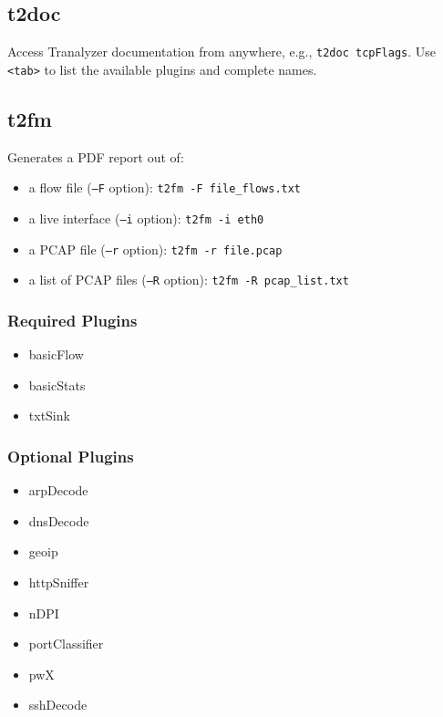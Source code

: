\documentclass[documentation]{subfiles}
\begin{document}
\subsection{t2doc}\label{t2doc}
Access Tranalyzer documentation from anywhere, e.g., {\tt t2doc tcpFlags}.
Use {\tt <tab>} to list the available plugins and complete names.

\subsection{t2fm}
Generates a PDF report out of:
\begin{itemize}
    \item a flow file ({\tt --F} option): {\tt t2fm -F file\_flows.txt}
    \item a live interface ({\tt --i} option): {\tt t2fm -i eth0}
    \item a PCAP file ({\tt --r} option): {\tt t2fm -r file.pcap}
    \item a list of PCAP files ({\tt --R} option): {\tt t2fm -R pcap\_list.txt}
\end{itemize}


\subsubsection{Required Plugins}
    \begin{multicols}{4}
        \begin{itemize}
            \item basicFlow
            \item basicStats
            \item txtSink
        \end{itemize}
    \end{multicols}

\subsubsection{Optional Plugins}
    \begin{multicols}{4}
        \begin{itemize}
            \item arpDecode
            \item dnsDecode
            \item geoip
            \item httpSniffer
            \item nDPI
            \item portClassifier
            \item pwX
            \item sshDecode
        \end{itemize}
    \end{multicols}
\end{document}
